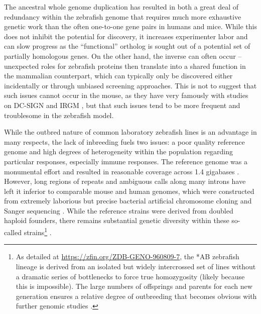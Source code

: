 The ancestral whole genome duplication has resulted in both a great deal of redundancy within the zebrafish genome that requires much more exhaustive genetic work than the often one\hyp{}to\hyp{}one gene pairs in humans and mice. While this does not inhibit the potential for discovery, it increases experimenter labor and can slow progress as the ``functional'' ortholog is sought out of a potential set of partially homologous genes. On the other hand, the inverse can often occur -- unexpected roles for zebrafish proteins then translate into a shared function in the mammalian counterpart, which can typically only be discovered either incidentally or through unbiased screening approaches. This is not to suggest that such issues cannot occur in the mouse, as they have very famously with studies on DC-SIGN \citep{GarciaVallejo2013, Tanne2009} and IRGM \citep{Dockterman2022, Henry2009, Singh2010, Bekpen2009, Singh2006,Bekpen2010}, but that such issues tend to be more frequent and troublesome in the zebrafish model.

While the outbred nature of common laboratory zebrafish lines is an advantage in many respects, the lack of inbreeding fuels two issues: a poor quality reference genome and high degrees of heterogeneity within the population regarding particular responses, especially immune responses. The reference genome was a monumental effort and resulted in reasonable coverage across 1.4 gigabases \citep{Howe2013}. However, long regions of repeats and ambiguous calls along many introns have left it inferior to comparable mouse and human genomes, which were constructed from extremely laborious but precise bacterial artificial chromosome cloning and Sanger sequencing \citep{Osoegawa2000}. While the reference strains were derived from doubled haploid founders, there remains substantial genetic diversity within these so\hyp{}called strains\footnote{As detailed at \url{https://zfin.org/ZDB-GENO-960809-7}, the *AB zebrafish lineage is derived from an isolated but widely intercrossed set of lines without a dramatic series of bottlenecks to force true homozygosity (likely because this is impossible). The large numbers of offsprings and parents for each new generation ensures a relative degree of outbreeding that becomes obvious with further genomic studies \citep{Deng2022}.} \citep{Suurvali2020, Holden2018, Deng2022, ZFIN}. 

